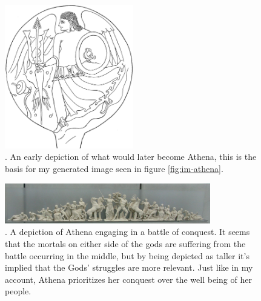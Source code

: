 \documentclass[letterpaper, reqno,11pt]{article}
\begin{document}
\begin{figure}[htpb]
  \centering
  \includegraphics[width=0.5\textwidth]{minerva}
  \caption{\cite{minerva}. An early depiction of what would later become Athena, this is the basis for my generated image seen in figure \ref{fig:im-athena}.}
  \label{fig:minerva}
\end{figure}

\begin{figure}[htpb]
    \centering
    \includegraphics[width=0.8\textwidth]{athena}
    \caption{\cite{poseidon}. A depiction of Athena engaging in a battle of conquest. It seems that the mortals on either side of the gods are suffering from the battle occurring in the middle, but by being depicted as taller it's implied that the Gods' struggles are more relevant. Just like in my account, Athena prioritizes her conquest over the well being of her people.}
    \label{fig:athena}
\end{figure}

\newpage
\newpage
\newpage

\printbibliography
\end{document}
